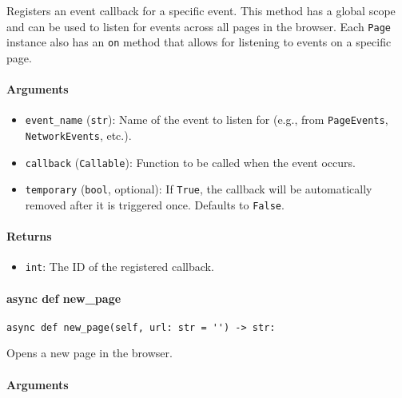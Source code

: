 \documentclass{article}
\begin{document}
\noindent Registers an event callback for a specific event. This method has a global scope and can be used to listen for events across all pages in the browser. Each \lstinline[style=pythonstyle]|Page| instance also has an \lstinline[style=pythonstyle]|on| method that allows for listening to events on a specific page.

\paragraph{Arguments}

\begin{itemize}
    \item \lstinline[style=pythonstyle]|event_name| (\lstinline[style=pythonstyle]|str|): Name of the event to listen for (e.g., from \lstinline[style=pythonstyle]|PageEvents|, \lstinline[style=pythonstyle]|NetworkEvents|, etc.).
    \item \lstinline[style=pythonstyle]|callback| (\lstinline[style=pythonstyle]|Callable|): Function to be called when the event occurs.
    \item \lstinline[style=pythonstyle]|temporary| (\lstinline[style=pythonstyle]|bool|, optional): If \lstinline[style=pythonstyle]|True|, the callback will be automatically removed after it is triggered once. Defaults to \lstinline[style=pythonstyle]|False|.
\end{itemize}

\paragraph{Returns}

\begin{itemize}
    \item \lstinline[style=pythonstyle]|int|: The ID of the registered callback.
\end{itemize}

\paragraph{async def new\_page}

\begin{lstlisting}[style=pythonstyle]
async def new_page(self, url: str = '') -> str:
\end{lstlisting}

\noindent Opens a new page in the browser.

\paragraph{Arguments}
\end{document}

